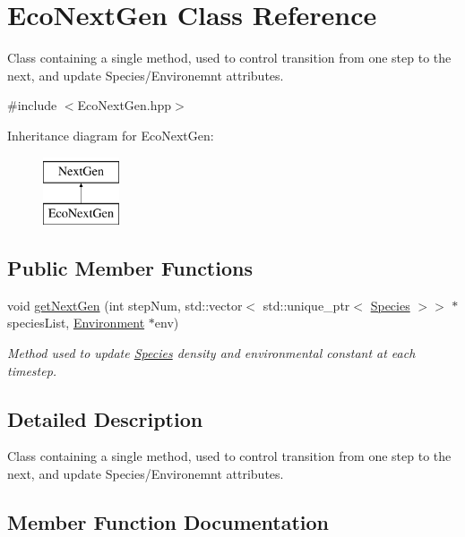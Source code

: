 \hypertarget{classEcoNextGen}{}\section{Eco\+Next\+Gen Class Reference}
\label{classEcoNextGen}


Class containing a single method, used to control transition from one step to the next, and update Species/\+Environemnt attributes.  




{\ttfamily \#include $<$Eco\+Next\+Gen.\+hpp$>$}

Inheritance diagram for Eco\+Next\+Gen\+:\begin{figure}[H]
\begin{center}
\leavevmode
\includegraphics[height=2.000000cm]{classEcoNextGen}
\end{center}
\end{figure}
\subsection*{Public Member Functions}
\begin{DoxyCompactItemize}
\item 
void \hyperlink{classEcoNextGen_a4cb2fccbd3221f41c249c97af461dd3c}{get\+Next\+Gen} (int step\+Num, std\+::vector$<$ std\+::unique\+\_\+ptr$<$ \hyperlink{classSpecies}{Species} $>$$>$ $\ast$species\+List, \hyperlink{classEnvironment}{Environment} $\ast$env)
\begin{DoxyCompactList}\small\item\em Method used to update \hyperlink{classSpecies}{Species} density and environmental constant at each timestep. \end{DoxyCompactList}\end{DoxyCompactItemize}


\subsection{Detailed Description}
Class containing a single method, used to control transition from one step to the next, and update Species/\+Environemnt attributes. 

\subsection{Member Function Documentation}
\mbox{\label{classEcoNextGen_a4cb2fccbd3221f41c249c97af461dd3c}} 
